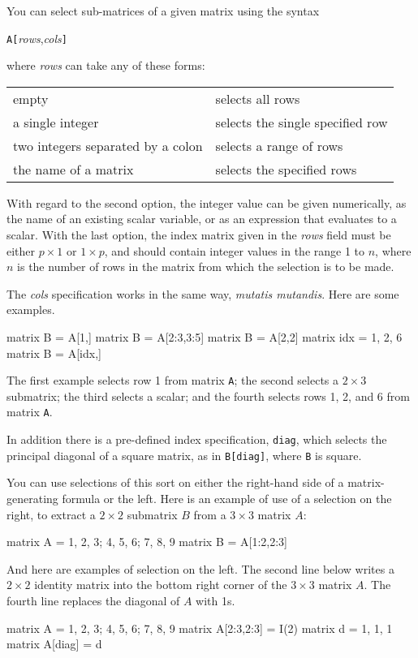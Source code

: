 You can select sub-matrices of a given matrix using the syntax

\texttt{A[}\textsl{rows},\textsl{cols}\texttt{]}

where \textsl{rows} can take any of these forms:

\begin{center}
\begin{tabular}{ll}
empty & selects all rows \\
a single integer & selects the single specified row \\
two integers separated by a colon & selects a range of rows \\
the name of a matrix & selects the specified rows \\
\end{tabular}
\end{center}

With regard to the second option, the integer value can be given
numerically, as the name of an existing scalar variable, or as an
expression that evaluates to a scalar.  With the last option, the
index matrix given in the \textsl{rows} field must be either $p\times
1$ or $1\times p$, and should contain integer values in the range 1 to
$n$, where $n$ is the number of rows in the matrix from which the
selection is to be made.

The \textsl{cols} specification works in the same way, \textit{mutatis
  mutandis}.  Here are some examples.
%
\begin{code}
matrix B = A[1,]
matrix B = A[2:3,3:5]
matrix B = A[2,2]
matrix idx = { 1, 2, 6 }
matrix B = A[idx,]
\end{code}
%
The first example selects row 1 from matrix \texttt{A}; the second
selects a $2\times 3$ submatrix; the third selects a scalar; and
the fourth selects rows 1, 2, and 6 from matrix \texttt{A}.

In addition there is a pre-defined index specification, \texttt{diag},
which selects the principal diagonal of a square matrix, as in
\texttt{B[diag]}, where \texttt{B} is square.

You can use selections of this sort on either the right-hand side of
a matrix-generating formula or the left.  Here is an example of use of
a selection on the right, to extract a $2\times 2$ submatrix $B$ from a
$3\times 3$ matrix $A$:
%
\begin{code}
matrix A = { 1, 2, 3; 4, 5, 6; 7, 8, 9 }
matrix B = A[1:2,2:3]
\end{code}
%
And here are examples of selection on the left.  The second line below
writes a $2\times 2$ identity matrix into the bottom right corner of the
$3\times 3$ matrix $A$.  The fourth line replaces the diagonal of $A$ 
with 1s.
%
\begin{code}
matrix A = { 1, 2, 3; 4, 5, 6; 7, 8, 9 }
matrix A[2:3,2:3] = I(2)
matrix d = { 1, 1, 1 }
matrix A[diag] = d
\end{code}

